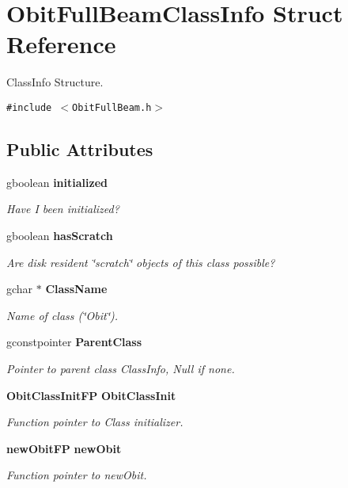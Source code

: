 \section{Obit\-Full\-Beam\-Class\-Info Struct Reference}
\label{structObitFullBeamClassInfo}
Class\-Info Structure.  


{\tt \#include $<$Obit\-Full\-Beam.h$>$}

\subsection*{Public Attributes}
\begin{CompactItemize}
\item 
gboolean {\bf initialized}
\begin{CompactList}\small\item\em Have I been initialized? \item\end{CompactList}\item 
gboolean {\bf has\-Scratch}
\begin{CompactList}\small\item\em Are disk resident \char`\"{}scratch\char`\"{} objects of this class possible? \item\end{CompactList}\item 
gchar $\ast$ {\bf Class\-Name}
\begin{CompactList}\small\item\em Name of class (\char`\"{}Obit\char`\"{}). \item\end{CompactList}\item 
gconstpointer {\bf Parent\-Class}
\begin{CompactList}\small\item\em Pointer to parent class Class\-Info, Null if none. \item\end{CompactList}\item 
{\bf Obit\-Class\-Init\-FP} {\bf Obit\-Class\-Init}
\begin{CompactList}\small\item\em Function pointer to Class initializer. \item\end{CompactList}\item 
{\bf new\-Obit\-FP} {\bf new\-Obit}
\begin{CompactList}\small\item\em Function pointer to new\-Obit. \item\end{CompactList}\item 

\end{CompactItemize}
